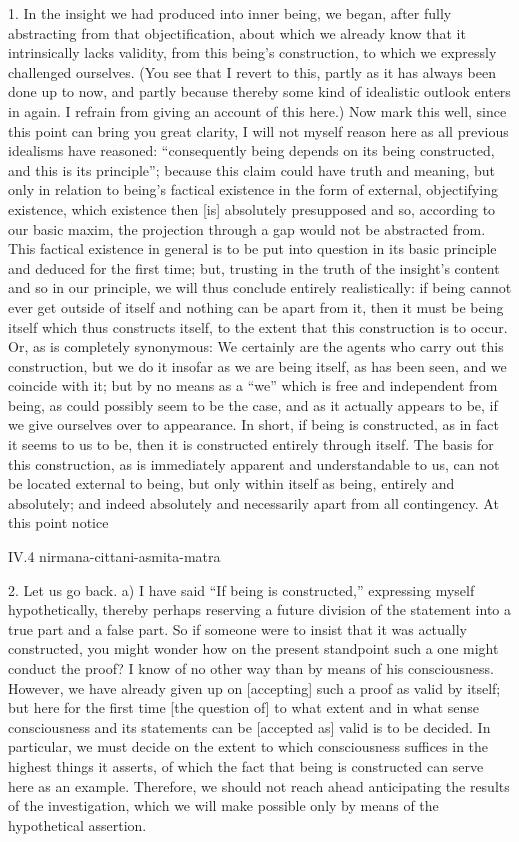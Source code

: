 1. In the insight we had produced into inner being,
we began, after fully abstracting from that objectification,
about which we already know that it intrinsically lacks validity,
from this being's construction,
to which we expressly challenged ourselves.
(You see that I revert to this,
partly as it has always been done up to now,
and partly because thereby some kind of
idealistic outlook enters in again.
I refrain from giving an account of this here.)
Now mark this well, since this point can bring you great clarity,
I will not myself reason here as all previous idealisms have reasoned:
“consequently being depends on its being constructed,
and this is its principle”;
because this claim could have truth and meaning,
but only in relation to being's factical existence
in the form of external, objectifying existence,
which existence then [is] absolutely presupposed
and so, according to our basic maxim,
the projection through a gap would not be abstracted from.
This factical existence in general is to be put into question
in its basic principle and deduced for the first time;
but, trusting in the truth of the insight's content
and so in our principle,
we will thus conclude entirely realistically:
if being cannot ever get outside of itself
and nothing can be apart from it,
then it must be being itself
which thus constructs itself,
to the extent that this construction is to occur.
Or, as is completely synonymous:
We certainly are the agents who carry out this construction,
but we do it insofar as we are being itself,
as has been seen, and we coincide with it;
but by no means as a “we” which
is free and independent from being,
as could possibly seem to be the case,
and as it actually appears to be,
if we give ourselves over to appearance.
In short, if being is constructed,
as in fact it seems to us to be,
then it is constructed entirely through itself.
The basis for this construction,
as is immediately apparent and understandable to us,
can not be located external to being,
but only within itself as being, entirely and absolutely;
and indeed absolutely and necessarily
apart from all contingency.
At this point notice

IV.4
nirmana-cittani-asmita-matra

2. Let us go back.
a) I have said “If being is constructed,”
expressing myself hypothetically,
thereby perhaps reserving a future division
of the statement into a true part and a false part.
So if someone were to insist that it was actually constructed,
you might wonder how on the present standpoint
such a one might conduct the proof?
I know of no other way than by means of his consciousness.
However, we have already given up on [accepting]
such a proof as valid by itself;
but here for the first time [the question of]
to what extent and in what sense
consciousness and its statements
can be [accepted as] valid is to be decided.
In particular, we must decide on the extent
to which consciousness suffices
in the highest things it asserts,
of which the fact that being is constructed
can serve here as an example.
Therefore, we should not reach ahead
anticipating the results of the investigation,
which we will make possible only by means of
the hypothetical assertion.

